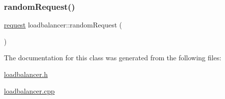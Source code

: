 \subsubsection{\texorpdfstring{random\+Request()}{randomRequest()}}
{\footnotesize\ttfamily \hyperlink{structrequest}{request} loadbalancer\+::random\+Request (\begin{DoxyParamCaption}{ }\end{DoxyParamCaption})}



The documentation for this class was generated from the following files\+:\begin{DoxyCompactItemize}
\item 
\hyperlink{loadbalancer_8h}{loadbalancer.\+h}\item 
\hyperlink{loadbalancer_8cpp}{loadbalancer.\+cpp}\end{DoxyCompactItemize}
